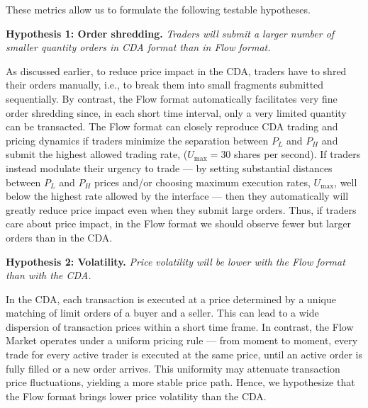 
These metrics allow us to formulate the following testable hypotheses. 

\noindent \textbf{Hypothesis 1: Order shredding.} \textit{Traders will submit a larger number of smaller quantity orders in CDA format than in Flow format.} 

\noindent As discussed earlier, to reduce price impact in the CDA, traders have to shred their orders manually, i.e., to break them into small fragments submitted sequentially. By contrast, the Flow format automatically facilitates very fine order shredding since, in each short time interval, only a very limited quantity can be transacted. 
The Flow format can closely reproduce CDA trading and pricing dynamics if traders minimize the separation between $P_L$ and $P_H$ and submit the highest allowed trading rate, ($U_{\text{max}}=30$ shares per second). 
If traders instead modulate their urgency to trade --- by setting substantial distances between $P_L$ and $P_H$ prices and/or choosing maximum execution rates, $U_{\text{max}}$, well below the highest rate allowed by the interface --- then they automatically will greatly reduce price impact even when they submit large orders. Thus, if traders care about price impact,
in the Flow format we should observe fewer but larger orders than in the CDA. 

\noindent \textbf{Hypothesis 2: Volatility.} \textit{Price volatility will be lower with the Flow format than with the CDA.}

\noindent In the CDA, each transaction is executed at a price determined by a unique matching of  limit orders of a buyer and a seller. This can lead to a wide dispersion of transaction prices within a short time frame. In contrast, the Flow Market operates under a uniform pricing rule — from moment to moment, every trade for every active trader is executed at the same price, until an active order is fully filled or a new order arrives. This uniformity may attenuate transaction price fluctuations, yielding a more stable price path. Hence, we hypothesize that the Flow format brings lower price volatility than the CDA. 

